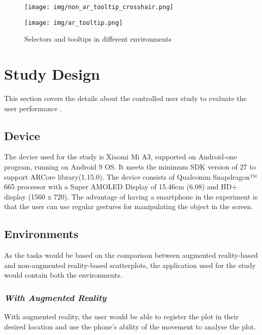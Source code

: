\documentclass[journal]{vgtc}                %
\begin{document}
\begin{figure}[ht]
    \begin{minipage}[b]{0.45\linewidth}
        \centering
        \texttt{[image: img/non\_ar\_tooltip\_crosshair.png]}
    \end{minipage}
    \hspace{0.5cm}
    \begin{minipage}[b]{0.45\linewidth}
        \centering
        \texttt{[image: img/ar\_tooltip.png]}
    \end{minipage}
    \caption{Selectors and tooltips in different environments}
\end{figure}


\section{Study Design}
This section covers the details about the controlled user study to evaluate the user performance \cite{lam2011empirical}.
\subsection{Device}
The device used for the study is Xiaomi Mi A3, supported on Android-one program, running on Android 9 OS. It meets the minimum SDK version of 27 to support ARCore library(1.15.0). The device consists of Qualcomm\textsuperscript{\textregistered} Snapdragon™ 665 processor with a Super AMOLED Display of 15.46cm (6.08) and HD+ display (1560 x 720). The advantage of having a smartphone in the experiment is that the user can use regular gestures for manipulating the object in the screen.


\subsection{Environments}
As the tasks would be based on the comparison between augmented reality-based and non-augmented reality-based scatterplots, the application used for the study would contain both the environments.
\subsubsection{\textit{With Augmented Reality}}
With augmented reality, the user would be able to register the plot in their desired location and use the phone's ability of the movement to analyse the plot.
\end{document}
